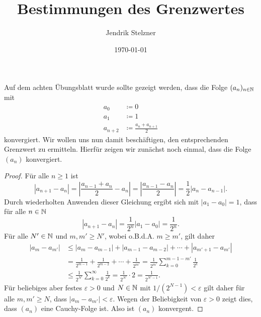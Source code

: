 \documentclass[a4paper,10pt]{article}
\title{Bestimmungen des Grenzwertes}
\author{Jendrik Stelzner}
\date{\today}
\begin{document}
\maketitle

Auf dem achten Übungsblatt wurde sollte gezeigt werden, dass die Folge $(a_n)_{n \in \mathbb{N}}$ mit
\begin{align*}
 a_0 &\coloneqq 0 \\
 a_1 &\coloneqq 1 \\
 a_{n+2} &\coloneqq \frac{a_n + a_{n+1}}{2}
\end{align*}
konvergiert. Wir wollen uns nun damit beschäftigen, den entsprechenden Grenzwert zu ermitteln. Hierfür zeigen wir zunächst noch einmal, dass die Folge $(a_n)$ konvergiert.

\begin{proof}
 Für alle $n \geq 1$ ist
 \[
  |a_{n+1}-a_n|
  = \left| \frac{a_{n-1} + a_n}{2} - a_n \right|
  = \left| \frac{a_{n-1} - a_n}{2} \right|
  = \frac{1}{2} |a_n-a_{n-1}|.
 \]
 Durch wiederholten Anwenden dieser Gleichung ergibt sich mit $|a_1 - a_0| = 1$, dass für alle $n \in \mathbb{N}$
 \[
  |a_{n+1} - a_n| = \frac{1}{2^n}|a_1 - a_0| = \frac{1}{2^n}.
 \]
 Für alle $N' \in \mathbb{N}$ und $m, m' \geq N'$, wobei o.B.d.A. $m \geq m'$, gilt daher
 \begin{align*}
  |a_m - a_{m'}|
  &\leq |a_m - a_{m-1}| + |a_{m-1} - a_{m-2}| + \dotsb + |a_{m'+1} - a_{m'}| \\
  &= \frac{1}{2^{m-1}} + \frac{1}{2^{m-2}} + \dotsb + \frac{1}{2^{m'}}
  = \frac{1}{2^{m'}} \sum_{k=0}^{m-1-m'} \frac{1}{2^k} \\
  &\leq \frac{1}{2^{N'}} \sum_{k=0}^\infty \frac{1}{2^k}
  = \frac{1}{2^{N'}} \cdot 2
  = \frac{1}{2^{N'-1}}.
 \end{align*}
 Für beliebiges aber festes $\varepsilon > 0$ und $N \in \mathbb{N}$ mit $1/(2^{N-1}) < \varepsilon$ gilt daher für alle $m, m' \geq N$, dass $|a_m - a_{m'}| < \varepsilon$. Wegen der Beliebigkeit von $\varepsilon > 0$ zeigt dies, dass $(a_n)$ eine Cauchy-Folge ist. Also ist $(a_n)$ konvergent.
\end{proof}
\end{document}
